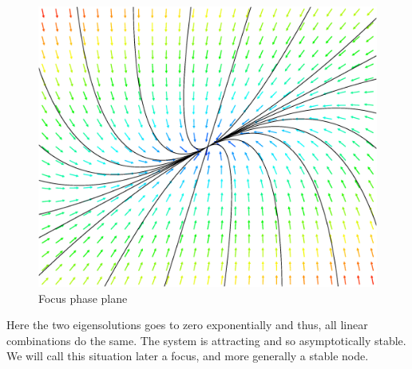 \begin{exemple}[focus]
\begin{figure}[H]
    \centering
    \includegraphics[scale=0.3]{images/focus.eps}
    \caption{Focus phase plane}
    \label{fig:focus}
\end{figure}
Here the two eigensolutions goes to zero exponentially and thus, all linear combinations do the same. The system is attracting and so asymptotically stable. We will call this situation later a focus, and more generally a stable node.
\end{exemple}

